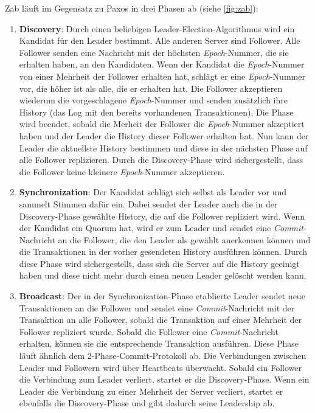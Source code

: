 Zab läuft im Gegensatz zu Paxos in drei Phasen ab (siehe \ref{fig:zab}):
\begin{enumerate}
	\item \textbf{Discovery}: Durch einen beliebigen Leader-Election-Algorithmus wird ein Kandidat für den Leader bestimmt. Alle anderen Server sind Follower. Alle Follower senden eine Nachricht mit der höchsten \textit{Epoch}-Nummer, die sie erhalten haben, an den Kandidaten. Wenn der Kandidat die \textit{Epoch}-Nummer von einer Mehrheit der Follower erhalten hat, schlägt er eine \textit{Epoch}-Nummer vor, die höher ist als alle, die er erhalten hat. Die Follower akzeptieren wiederum die vorgeschlagene \textit{Epoch}-Nummer und senden zusätzlich ihre History (das Log mit den bereits vorhandenen Transaktionen).
	Die Phase wird beendet, sobald die Merheit der Follower die \textit{Epoch}-Nummer akzeptiert haben und der Leader die History dieser Follower erhalten hat. Nun kann der Leader die aktuellste History bestimmen und diese in der nächsten Phase auf alle Follower replizieren. Durch die Discovery-Phase wird sichergestellt, dass die Follower keine kleinere \textit{Epoch}-Nummer akzeptieren.
	\item \textbf{Synchronization}: Der Kandidat schlägt sich selbst als Leader vor und sammelt Stimmen dafür ein. Dabei sendet der Leader auch die in der Discovery-Phase gewählte History, die auf die Follower repliziert wird. Wenn der Kandidat ein Quorum hat, wird er zum Leader und sendet eine \textit{Commit}-Nachricht an die Follower, die den Leader als gewählt anerkennen können und die Transaktionen in der vorher gesendeten History ausführen können. Durch diese Phase wird sichergestellt, dass sich die Server auf die History geeinigt haben und diese nicht mehr durch einen neuen Leader gelöscht werden kann.
	\item \textbf{Broadcast}: Der in der Synchronization-Phase etablierte Leader sendet neue Transaktionen an die Follower und sendet eine \textit{Commit}-Nachricht mit der Transaktion an alle Follower, sobald die Transaktion auf einer Mehrheit der Follower repliziert wurde. Sobald die Follower eine \textit{Commit}-Nachricht erhalten, können sie die entsprechende Transaktion ausführen. Diese Phase läuft ähnlich dem 2-Phase-Commit-Protokoll \cite{pc} ab. Die Verbindungen zwischen Leader und Followern wird über Heartbeats überwacht. Sobald ein Follower die Verbindung zum Leader verliert, startet er die Discovery-Phase. Wenn ein Leader die Verbindung zu einer Mehrheit der Server verliert, startet er ebenfalls die Discovery-Phase und gibt dadurch seine Leadership ab.
\end{enumerate}

